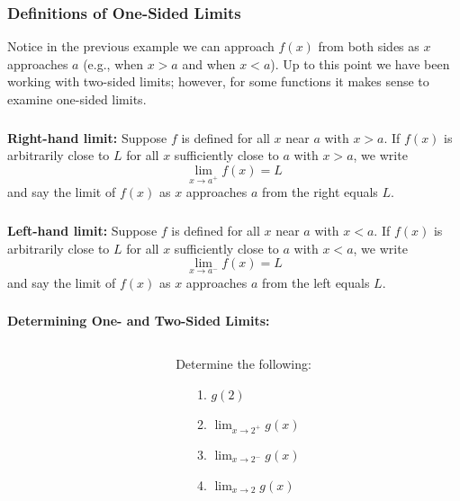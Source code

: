 \documentclass[14pt]{beamer}
\begin{document}
\begin{frame}
\frametitle{Definitions of One-Sided Limits}
Notice in the previous example we can approach $f(x)$ from both sides as $x$ approaches $a$ (e.g., when $x>a$ and when $x<a$).  Up to this point we have been working with two-sided limits; however, for some functions it makes sense to examine one-sided limits.
\end{frame} 

\begin{frame}
\frametitle{}{\bf Right-hand limit:}  Suppose $f$ is defined for all $x$ near $a$ with $x>a$.  If $f(x)$ is arbitrarily close to $L$ for all $x$ sufficiently close to $a$ with $x>a$, we write
$$\lim_{x \to a^+} f(x)=L$$ 
and say the limit of $f(x)$ as $x$ approaches $a$ from the right equals $L$.
\end{frame}

\begin{frame}
\frametitle{}
{\bf Left-hand limit:}  Suppose $f$ is defined for all $x$ near $a$ with $x<a$.  If $f(x)$ is arbitrarily close to $L$ for all $x$ sufficiently close to $a$ with $x<a$, we write
$$\lim_{x \to a^-} f(x)=L$$ 
and say the limit of $f(x)$ as $x$ approaches $a$ from the left equals $L$.
\end{frame}

\begin{frame}
\frametitle{}
{\bf Determining One- and Two-Sided Limits:}
\begin{columns}[T]
\begin{column}{.5\textwidth}
\begin{block}
\end{block}
\end{column}
\begin{column}{.5\textwidth}
\begin{block}
{Determine the following:}
\begin{itemize}
\item[1.] $g(2)$
\item[2.] $\displaystyle\lim_{x \to 2^+} g(x)$
\item[3.] $\displaystyle\lim_{x \to 2^-} g(x)$
\item[4.] $\displaystyle\lim_{x \to 2} g(x)$
\end{itemize}
\end{block}
\end{column}
\end{columns}
\end{frame}
\end{document}
